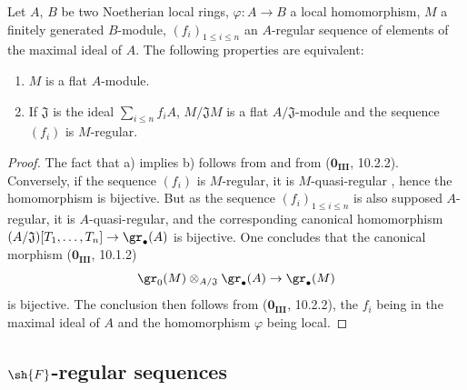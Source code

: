 \begin{proposition}[15.1.21]
\label{0.15.1.21}
Let $A$, $B$ be two Noetherian local rings, $\varphi:A\to B$ a local homomorphism, $M$ a finitely generated $B$-module, $(f_i)_{1\leq i\leq n}$ an $A$-regular sequence of elements of the maximal ideal of $A$.
The following properties are equivalent:
\begin{enumerate}
  \item[a)] $M$ is a flat $A$-module.
  \item[b)] If $\mathfrak{J}$ is the ideal $\sum_{i\leq n}f_iA$, $M/\mathfrak{J}M$ is a flat $A/\mathfrak{J}$-module and the sequence $(f_i)$ is $M$-regular.
\end{enumerate}
\end{proposition}

\begin{proof}
The fact that a) implies b) follows from  and from ($\mathbf{0_{III}}$, 10.2.2).
Conversely, if the sequence $(f_i)$ is $M$-regular, it is $M$-quasi-regular , hence the homomorphism  is bijective.
But as the sequence $(f_i)_{1\leq i\leq n}$ is also supposed $A$-regular, it is $A$-quasi-regular, and the corresponding canonical homomorphism $(A/\mathfrak{J})[T_1,\ldots,T_n]\to\gr_\bullet(A)$ is bijective.
One concludes that the canonical morphism ($\mathbf{0_{III}}$, 10.1.2)
\[
  \gr_0(M)\otimes_{A/\mathfrak{J}}\gr_\bullet(A) \to \gr_\bullet(M)
\]
is bijective.
The conclusion then follows from ($\mathbf{0_{III}}$, 10.2.2), the $f_i$ being in the maximal ideal of $A$ and the homomorphism $\varphi$ being local.
\end{proof}

\subsection{\texorpdfstring{$\sh{F}$}{F}-regular sequences}
\label{subsection:0.15.2}

